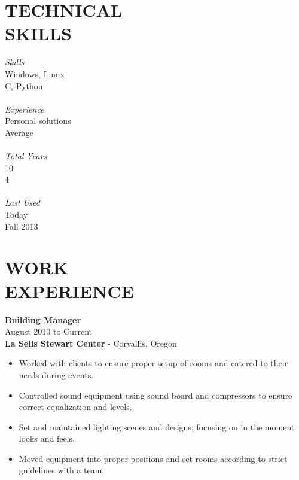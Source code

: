 \documentclass[mm]{res}
\begin{document}
\begin{resume}
\section{TECHNICAL \\ SKILLS} 
\begin{multicols}{4}
	{\sl Skills} \\
	Windows, Linux \\
	C, Python \\ \\
	{\sl Experience} \\
	Personal solutions \\
	Average \\  \\
	{\sl Total Years} \\
	10 \\
	4 \\ \\ 
	{\sl Last Used} \\
	Today \\
	Fall 2013 \\
\end{multicols}
 
\section{WORK \\ EXPERIENCE}  
	\textbf{Building Manager} \\
	August 2010 to Current \\                
	\textbf{La Sells Stewart Center} - Corvallis, Oregon \\
\begin{itemize} \parskip0pt  \itemsep-8pt
	\item Worked with clients to ensure proper setup of rooms and catered to their needs during events. \\
	\item Controlled sound equipment using sound board and compressors to ensure correct equalization and levels. \\
	\item Set and maintained lighting scenes and designs; focusing on in the moment looks and feels. \\
	\item Moved equipment into proper positions and set rooms according to strict guidelines with a team. \\
\end{itemize}



\end{resume}
\end{document}
